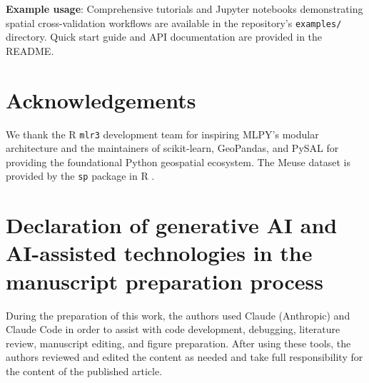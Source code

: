 \documentclass[a4paper,fleqn]{cas-sc}
\begin{document}
\textbf{Example usage}: Comprehensive tutorials and Jupyter notebooks demonstrating spatial cross-validation workflows are available in the repository's \texttt{examples/} directory. Quick start guide and API documentation are provided in the README.


\section*{Acknowledgements}

We thank the R \texttt{mlr3} development team for inspiring MLPY's modular architecture and the maintainers of scikit-learn, GeoPandas, and PySAL for providing the foundational Python geospatial ecosystem. The Meuse dataset is provided by the \texttt{sp} package in R \citep{pebesma2005classes}.


\section*{Declaration of generative AI and AI-assisted technologies in the manuscript preparation process}

During the preparation of this work, the authors used Claude (Anthropic) and Claude Code in order to assist with code development, debugging, literature review, manuscript editing, and figure preparation. After using these tools, the authors reviewed and edited the content as needed and take full responsibility for the content of the published article.




\end{document}
